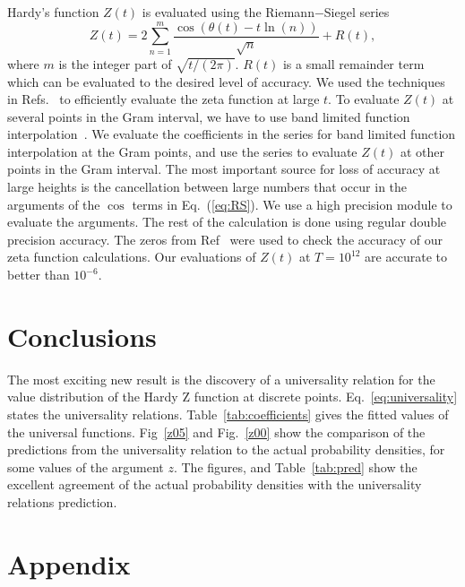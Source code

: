 \documentclass[twoside]{article}
\begin{document}
Hardy's function $Z(t)$  is evaluated using the Riemann$-$Siegel series
\begin{equation}
Z(t) = 2\sum^{m}_{n=1}\frac{\cos(\theta(t) - t \ln (n))}{\sqrt{n}} + R(t), 
\label{eq:RS}
\end{equation}
where $m$ is the integer part of $\sqrt{t/(2\pi)}$. $R(t)$ is a small remainder
term which can be evaluated to the desired level of accuracy. We used the techniques in
 Refs.~\cite{Odlyzko 1992,hiary,gourdon} 
to efficiently evaluate the zeta function at large $t$. To evaluate  $Z(t)$  at several points 
in the Gram interval, we have to use band limited function interpolation~\cite{Jerri 1977}. 
We evaluate the coefficients in the series for band limited function interpolation at the Gram points, 
and use the series to evaluate $Z(t)$ at other points in the Gram interval. The most important 
source for loss of accuracy at large heights is the cancellation between
large numbers that occur in the arguments of the $\cos$ terms in Eq.~(\ref{eq:RS}). We 
use a high precision module to evaluate the arguments. The rest of the calculation
is done using regular double precision accuracy. The  zeros from Ref~\cite{hiary 2010} were used 
to check the accuracy of our zeta function calculations. Our evaluations of $Z(t)$ at $T=10^{12}$ 
are accurate 
to better than $10^{-6}$. 



\section{\label{conclusions}Conclusions}

The most exciting new result is the discovery of a universality relation for the 
value distribution of the Hardy Z function at discrete points. Eq.~\ref{eq:universality}
states the universality relations. Table~\ref{tab:coefficients} gives the fitted values 
of the universal functions.
Fig~\ref{z05} and Fig.~\ref{z00} show the comparison of the predictions from the universality 
relation to the actual probability densities, for some values of the argument $z$. The figures, and 
Table~\ref{tab:pred} show the excellent agreement of the actual probability densities with the
universality relations prediction.

\section*{\label{appendix} Appendix}
\end{document}
